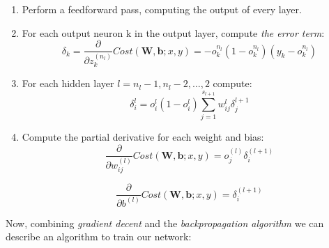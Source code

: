 \begin{enumerate}
	\item Perform a feedforward pass, computing the output of every layer.
	\item For each output neuron k in the output layer, compute \textit{the error term}: 
	\begin{equation}
		\delta_k = \frac{\partial}{\partial z_{k}^{(n_l)} }Cost(\mathbf{W,b}; x, y) = -o_k^{n_l}(1-o_k^{n_l})(y_k-o_k^{n_l})
	\end{equation} 
	\item For each hidden layer $ l = n_l - 1, n_l - 2,\dots, 2 $ compute: 
	\begin{equation}
		\delta_i^{l} = o_i^l(1-o_i^l)\sum_{j=1}^{s_{l+1}} w_{ij}^l \delta_j^{l+1} 
	\end{equation}
	\item Compute the partial derivative for each weight and bias:
	\begin{equation}
		\frac{\partial}{\partial w_{ij}^{(l)} }Cost(\mathbf{W,b}; x, y) = o_j^{(l)}\delta_i^{(l+1)}
	\end{equation}
	
	\begin{equation}
		\frac{\partial}{\partial b^{(l)} }Cost(\mathbf{W,b}; x, y) = \delta_i^{(l+1)}
	\end{equation}
\end{enumerate}
	
Now, combining \textit{gradient decent} and the \textit{backpropagation algorithm} we can describe an algorithm to train our network: 

